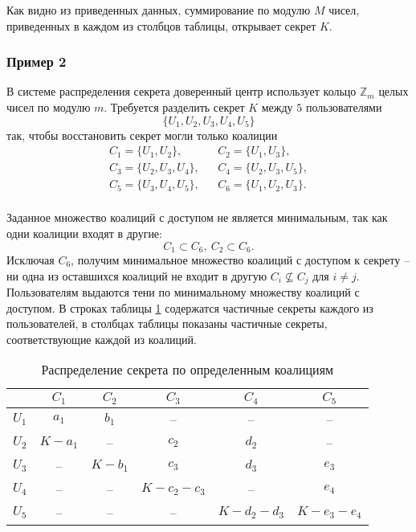 \documentclass[10pt,a4paper]{book}
\newcommand{\example}{\textsc{\textbf{Пример.}} }
\newcommand{\group}[1]{\mathbb{#1}}
\newcommand{\Z}{\group{Z}}
\begin{document}
Как видно из приведенных данных, суммирование по модулю $M$ чисел, приведенных в каждом из столбцов таблицы, открывает секрет $K$.


\subsubsection{Пример 2}

В системе распределения секрета доверенный
центр использует кольцо $\Z_m$ целых чисел по модулю $m$. Требуется разделить секрет $K$ между $5$ пользователями
    \[ \{ U_1, U_2, U_3, U_4, U_5 \} \]
так, чтобы восстановить секрет могли только коалиции
\[ \begin{array}{lll}
    C_1 = \{ U_1, U_2 \},      & & C_2 = \{ U_1, U_3 \}, \\
    C_3 = \{ U_2, U_3, U_4 \}, & & C_4 = \{ U_2, U_3, U_5 \}, \\
    C_5 = \{ U_3, U_4, U_5 \}, & & C_6 = \{ U_1, U_2, U_3 \}. \\
\end{array} \]

Заданное множество коалиций с доступом не является минимальным, так как одни коалиции входят в другие:
    \[ C_1 \subset C_6, ~ C_2 \subset C_6. \]
Исключая $C_6$, получим минимальное множество коалиций с доступом к секрету -- ни одна из оставшихся коалиций не входит в другую $C_i \nsubseteq C_j$ для $i \neq j$. Пользователям выдаются тени по минимальному множеству коалиций с доступом. В строках таблицы \ref{tab:secret-share-coalition-2} содержатся частичные секреты каждого из пользователей, в столбцах таблицы показаны частичные секреты, соответствующие каждой из коалиций.

\begin{table}[h!]
    \centering
    \caption{Распределение секрета по определенным коалициям\label{tab:secret-share-coalition-2}}
    \begin{tabular}{|c||c|c|c|c|c|}
        \hline
              & $C_1$     & $C_2$     & $C_3$           & $C_4$           & $C_5$  \\
        \hline \hline
        $U_1$ & $a_1$     & $b_1$     & --              & --              & -- \\
        $U_2$ & $K - a_1$ & --        & $c_2$           & $d_2$           & --\\
        $U_3$ & --        & $K - b_1$ & $c_3$           & $d_3$           & $e_3$ \\
        $U_4$ & --        & --        & $K - c_2 - c_3$ & --              & $e_4$ \\
        $U_5$ & --        & --        & --              & $K - d_2 - d_3$ & $K - e_3 - e_4$ \\
        \hline
    \end{tabular}
\end{table}
\end{document}
